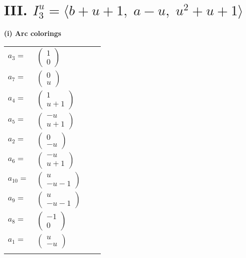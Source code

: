 \documentclass[1p]{elsarticle_modified}
\theoremstyle{definition}
\begin{document}
\centering \section*{III. $I^u_{3}= \langle b+u+1,\;a- u,\;u^2+u+1 \rangle$}
\flushleft \textbf{(i) Arc colorings}\\
\begin{tabular}{m{7pt} m{180pt} m{7pt} m{180pt} }
\flushright $a_{3}=$&$\begin{pmatrix}1\\0\end{pmatrix}$ \\
\flushright $a_{7}=$&$\begin{pmatrix}0\\u\end{pmatrix}$ \\
\flushright $a_{4}=$&$\begin{pmatrix}1\\u+1\end{pmatrix}$ \\
\flushright $a_{5}=$&$\begin{pmatrix}- u\\u+1\end{pmatrix}$ \\
\flushright $a_{2}=$&$\begin{pmatrix}0\\- u\end{pmatrix}$ \\
\flushright $a_{6}=$&$\begin{pmatrix}- u\\u+1\end{pmatrix}$ \\
\flushright $a_{10}=$&$\begin{pmatrix}u\\- u-1\end{pmatrix}$ \\
\flushright $a_{9}=$&$\begin{pmatrix}u\\- u-1\end{pmatrix}$ \\
\flushright $a_{8}=$&$\begin{pmatrix}-1\\0\end{pmatrix}$ \\
\flushright $a_{1}=$&$\begin{pmatrix}u\\- u\end{pmatrix}$\\&\end{tabular}
\end{document}
